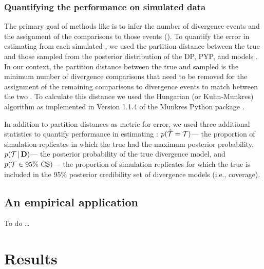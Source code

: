 \documentclass[letterpaper,12pt]{article}
\begin{document}
\subsubsection{Quantifying the performance on simulated data}

The primary goal of methods like \ecoevolity is to infer the number of
divergence events and the assignment of the comparisons to those events
(\etimesets).
To quantify the error in estimating \etimesets from each simulated \dataset, we
used the partition distance between the true \etimesets and those sampled from
the posterior distribution of the DP, PYP, and \wunif models
\citep{Regnier1983,Gusfield2002}.
In our context, the partition distance between the true and sampled \etimesets
is the minimum number of divergence comparisons that need to be removed for the
assignment of the remaining comparisons to divergence events to match between
the two \etimesets.
To calculate this distance we used the Hungarian (or Kuhn-Munkres) algorithm
\citep{Kuhn1955,Munkres1957}
as implemented in Version 1.1.4 of the Munkres Python package
\citep{Clapper2020}.

In addition to partition distances as metric for \etimesets error, we used
three additional statistics to quantify performance in estimating \etimesets:
$p(\hat{\mathcal{T}} =\mathcal{T})$---
    the proportion of simulation replicates in which the true \etimesets had
    the maximum posterior probability,
$p(\mathcal{T} \,|\, \mathbf{D})$---
    the posterior probability of the true divergence model,
and
$p(\mathcal{T} \in \textrm{95\% CS})$---
    the proportion of simulation replicates for which the true \etimesets is
    included in the 95\% posterior credibility set of divergence models (i.e.,
    coverage).


\subsection{An empirical application}

To do \ldots

\section{Results}
\end{document}
